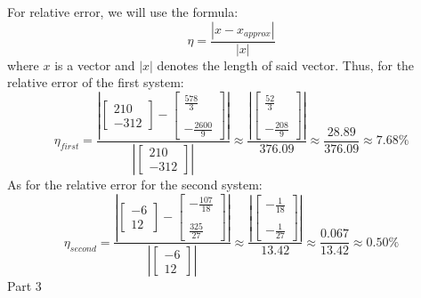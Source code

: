 \documentclass[10pt]{article} %
\begin{document}
\\ \\
For relative error, we will use the formula:
\begin{equation}
\eta = \frac{|x - x_{approx}|}{|x|}
\end{equation}
where $x$ is a vector and $|x|$ denotes the length of said vector. Thus, for the relative error of the first system:
\begin{equation}
\eta_{first} = \frac{\left| \left[\begin{array}{c} 210 \\ -312 \end{array}\right] - \left[\begin{array}{c} \frac{578}{3} \\ \\ -\frac{2600}{9} \end{array}\right]\right|}{\left| \left[\begin{array}{c} 210 \\ -312 \end{array}\right]\right|} \approx \frac{\left| \left[\begin{array}{c} \frac{52}{3} \\ \\ -\frac{208}{9} \end{array}\right] \right|}{376.09} \approx \frac{28.89}{376.09} \approx 7.68\%
\end{equation}
As for the relative error for the second system:
\begin{equation}
\eta_{second} = \frac{\left| \left[\begin{array}{c} -6 \\ 12 \end{array}\right] - \left[\begin{array}{c} -\frac{107}{18} \\ \\ \frac{325}{27} \end{array}\right]\right|}{\left| \left[\begin{array}{c} -6 \\ 12 \end{array}\right]\right|} \approx \frac{\left| \left[\begin{array}{c} -\frac{1}{18} \\ \\ -\frac{1}{27} \end{array}\right] \right|}{13.42} \approx \frac{0.067}{13.42} \approx 0.50\%
\end{equation}
\newpage
\noindent \large{Part 3}
\end{document}
